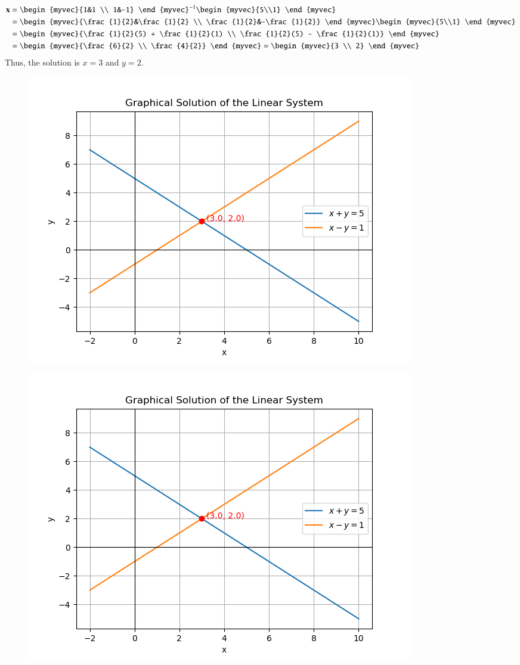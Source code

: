 \documentclass[journal]{IEEEtran}
\begin{document}
	\begin{align}
		\vec{x} &= \begin{myvec}{1&1 \\ 1&-1} \end{myvec}^{-1} \begin{myvec}{5\\1} \end{myvec} \\
		&= \begin{myvec}{\frac{1}{2}&\frac{1}{2} \\ \frac{1}{2}&-\frac{1}{2}} \end{myvec} \begin{myvec}{5\\1} \end{myvec} \\
		&= \begin{myvec}{\frac{1}{2}(5) + \frac{1}{2}(1) \\ \frac{1}{2}(5) - \frac{1}{2}(1)} \end{myvec} \\
		&= \begin{myvec}{\frac{6}{2} \\ \frac{4}{2}} \end{myvec} = \begin{myvec}{3 \\ 2} \end{myvec}
	\end{align}
	Thus, the solution is $x=3$ and $y=2$.
	
	
	\begin{figure}[H]
		\centering
		\includegraphics[width = 0.8\columnwidth]{figs/Figure_1.png}
		\caption*{}
		\label{fig1}
	\end{figure}
	\begin{figure}[H]
		\centering
		\includegraphics[width = 0.8\columnwidth]{figs/Figure_2.png}
		\caption*{}
		\label{fig2}
	\end{figure}
	
\end{document}
